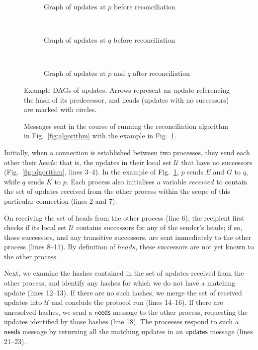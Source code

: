 \documentclass[manuscript,anonymous]{acmart}
\begin{document}
\begin{figure}[p]
\begin{minipage}{0.4\linewidth}
    \begin{subfigure}{\textwidth}
    
    \caption{Graph of updates at $p$ before reconciliation}
    \end{subfigure}\\[35pt]
    \begin{subfigure}{\textwidth}
    
    \caption{Graph of updates at $q$ before reconciliation}
    \end{subfigure}\\[35pt]
    \begin{subfigure}{\textwidth}
    
    \caption{Graph of updates at $p$ and $q$ after reconciliation}
    \end{subfigure}
    \caption{Example DAGs of updates. Arrows represent an update referencing the hash of its predecessor, and heads (updates with no successors) are marked with circles.}
    \label{fig:example-dags}
\end{minipage}
\end{figure}

\begin{figure}[p]
    \centering
    
    \caption{Messages sent in the course of running the reconciliation algorithm in Fig.~\ref{fig:algorithm} with the example in Fig.~\ref{fig:example-dags}.}
    \label{fig:messages}
\end{figure}

Initially, when a connection is established between two processes, they send each other their \emph{heads}: that is, the updates in their local set $\mathcal{U}$ that have no successors (Fig.~\ref{fig:algorithm}, lines 3--4).
In the example of Fig.~\ref{fig:example-dags}, $p$ sends $E$ and $G$ to $q$, while $q$ sends $K$ to $p$.
Each process also initialises a variable $\mathit{received}$ to contain the set of updates received from the other process within the scope of this particular connection (lines 2 and 7).

On receiving the set of heads from the other process (line 6), the recipient first checks if its local set $\mathcal{U}$ contains successors for any of the sender's heads; if so, those successors, and any transitive successors, are sent immediately to the other process (lines 8--11).
By definition of $\mathit{heads}$, these successors are not yet known to the other process.

Next, we examine the hashes contained in the set of updates received from the other process, and identify any hashes for which we do not have a matching update (lines 12--13).
If there are no such hashes, we merge the set of received updates into $\mathcal{U}$ and conclude the protocol run (lines 14--16).
If there are unresolved hashes, we send a $\mathsf{needs}$ message to the other process, requesting the updates identified by those hashes (line 18).
The processes respond to such a $\mathsf{needs}$ message by returning all the matching updates in an $\mathsf{updates}$ message (lines 21--23).
\end{document}
